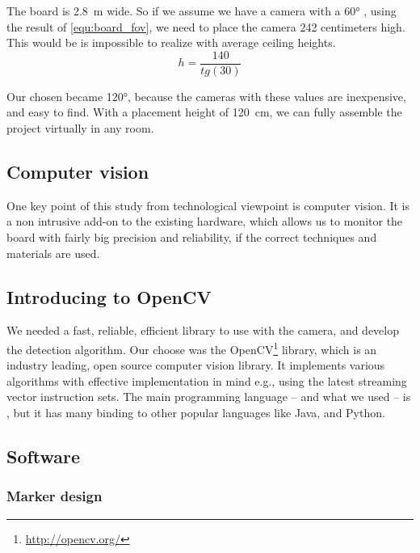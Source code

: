\begin{example}
	The board is 2.8~\si{\meter} wide. So if we assume we have a camera with a \ang{60} , using the result of \cref{equ:board_fov}, we need to place the camera 242 centimeters high. This would be is impossible to realize with average ceiling heights.
	\begin{equation}
		\label{equ:board_fov}
		h = \frac{140}{tg(30)}
	\end{equation}
\end{example}

Our chosen  became \ang{120}, because the cameras with these  values are inexpensive, and easy to find. With a placement height of 120~\si{\centi\meter}, we can fully assemble the project virtually in any room.

\subsection{Computer vision}

One key point of this study from technological viewpoint is computer vision. It is a non intrusive add-on to the existing hardware, which allows us to monitor the board with fairly big precision and reliability, if the correct techniques and materials are used.

\subsection{Introducing to OpenCV}

We needed a fast, reliable, efficient library to use with the camera, and develop the detection algorithm. Our choose was the OpenCV\footnote{\url{http://opencv.org/}} library, which is an industry leading, open source computer vision library. It implements various algorithms with effective implementation in mind e.g., using the latest streaming vector instruction sets. The main programming language -- and what we used -- is , but it has many binding to other popular languages like Java, and Python.

\subsection{Software}

\subsubsection{Marker design}

